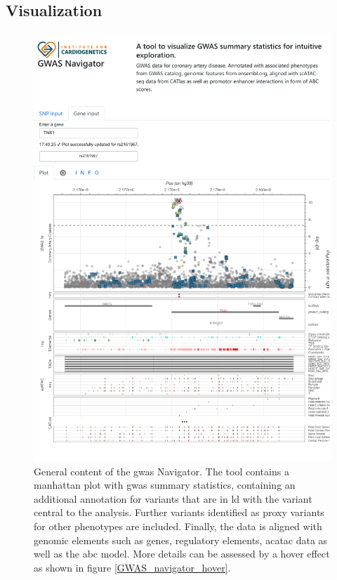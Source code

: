     \subsection{Visualization}
    \label{subsec:result_vis}

    \begin{figure}[h!]
    \capstart
        \centering
        \includegraphics{Abbildung/GWAS_navigator_screenshot.pdf}

        \begin{minipage}{\captionwidth}
            \caption[database]{\newline
            General content of the \ac{gwas} Navigator. The tool contains a manhattan plot with \ac{gwas} summary statistics, containing an additional annotation for variants that are in \ac{ld} with the variant central to the analysis. Further variants identified as proxy variants for other phenotypes are included. Finally, the data is aligned with genomic elements such as genes, regulatory elements, ac\ac{atac} data as well as the \ac{abc} model. More details can be assessed by a hover effect as shown in figure \ref{GWAS_navigator_hover}.}
            \label{fig:navigator}
        \end{minipage}
    \end{figure}


